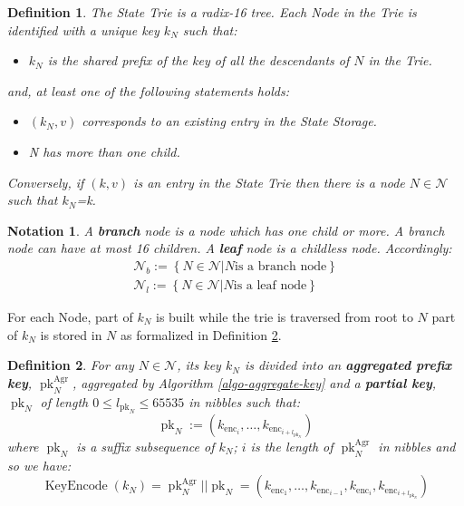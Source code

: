 \documentclass{book}
\newcommand{\assign}{:=}
\newcommand{\tmop}[1]{\ensuremath{\operatorname{#1}}}
\newcommand{\tmstrong}[1]{\textbf{#1}}
\newcommand{\tmtextbf}[1]{{\bfseries{#1}}}
\newcommand{\tmtexttt}[1]{{\ttfamily{#1}}}
\newcommand{\tmverbatim}[1]{{\ttfamily{#1}}}
\newenvironment{itemizeminus}{\begin{itemize} \renewcommand{\labelitemi}{$-$}\renewcommand{\labelitemii}{$-$}\renewcommand{\labelitemiii}{$-$}\renewcommand{\labelitemiv}{$-$}}{\end{itemize}}
\newtheorem{definition}{Definition}
\newtheorem{notation}{Notation}
\providecommand{\tmop}[1]{\ensuremath{\mathrm{#1}}}
\providecommand{\tmstrong}[1]{\tmtextbf{#1}}
\providecommand{\tmtextbf}[1]{\tmtextbf{#1}}
\providecommand{\tmverbatim}[1]{\tmtexttt{#1}}
\newtheorem{definition}{Definition}
\newtheorem{notation}{Notation}
\begin{document}
\begin{definition}
  \label{defn-nodetype}The State Trie is a radix-16 tree. Each Node in the
  Trie is identified with a unique key $k_N$ such that:
  \begin{itemizeminus}
    \item $k_N$ is the shared prefix of the key of all the descendants of $N$
    in the Trie.
  \end{itemizeminus}
  and, at least one of the following statements holds:
  \begin{itemizeminus}
    \item $(k_N, v)$ corresponds to an existing entry in the State Storage.
    
    \item N has more than one child.
  \end{itemizeminus}
  \tmverbatim{}Conversely, if $(k, v)$ is an entry in the State Trie then
  there is a node $N \in \mathcal{N}$ such that $k_N$=k.
\end{definition}

\begin{notation}
  A {\tmstrong{branch}} node is a node which has one child or more. A branch
  node can have at most 16 children. A {\tmstrong{leaf}} node is a childless
  node. Accordingly:
  \[ \begin{array}{c}
       \mathcal{N}_b \assign \left\{ N \in \mathcal{N}|N \text{is a branch
       node} \right\}\\
       \mathcal{N}_l \assign \left\{ N \in \mathcal{N}|N \text{is a leaf node}
       \right\}
     \end{array} \]
\end{notation}

For each Node, part of $k_N$ is built while the trie is traversed from root to
$N$ part of $k_N$ is stored in $N$ as formalized in Definition
\ref{defn-node-key}.

\begin{definition}
  \label{defn-node-key}For any $N \in \mathcal{N}$, its key $k_N$ is divided
  into an {\tmstrong{aggregated prefix key}},
  {\tmstrong{$\tmop{pk}_N^{\tmop{Agr}}$}}, aggregated by Algorithm
  \ref{algo-aggregate-key} and a {\tmstrong{partial key}},
  {\tmstrong{$\tmop{pk}_N$}} of length $0 \leqslant l_{\tmop{pk}_N} \leqslant
  65535$ in nibbles such that:
  \[ \tmop{pk}_N \assign (k_{\tmop{enc}_i}, \ldots, k_{\tmop{enc}_{i +
     l_{\tmop{pk}_N}}}) \]
  where $\tmop{pk}_N$ is a suffix subsequence of $k_N$; $i$ is the length of
  $\tmop{pk}_N^{\tmop{Agr}}$ in nibbles and so we have:
  \[ \tmop{KeyEncode} (k_N) = \tmop{pk}_N^{\tmop{Agr}} | | \tmop{pk}_N =
     (k_{\tmop{enc}_1}, \ldots, k_{\tmop{enc}_{i - 1}}, k_{\tmop{enc}_i},
     k_{\tmop{enc}_{i + l_{\tmop{pk}_N}}}) \]
\end{definition}
\end{document}
